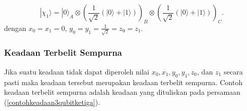 \begin{equation}
	|\chi_1\rangle
	=
	|0\rangle_A \otimes
	\left(
	\frac{1}{\sqrt{2}}
	(|0\rangle + |1\rangle)
	\right)_B
	\otimes
	\left(
	\frac{1}{\sqrt{2}}
	(|0\rangle + |1\rangle)
	\right)_C .
\end{equation}
dengan $x_0=x_1=0$, $y_0=y_1=\frac{1}{\sqrt{2}}=z_0=z_1$.

\subsubsection{Keadaan Terbelit Sempurna}
\par
Jika suatu keadaan tidak dapat diperoleh nilai $x_0, x_1, y_0, y_1, z_0$, dan $z_1$ secara pasti maka keadaan tersebut merupakan keadaan terbelit sempurna. Contoh keadaan terbelit sempurna adalah keadaan yang dituliskan pada persamaan (\ref{contohkeadaan3qubitketiga}).

